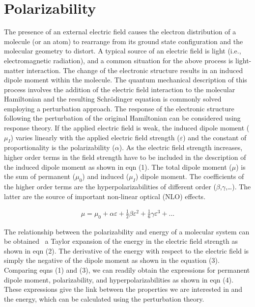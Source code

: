 \Appendix{}

\label{appendix:A}

\section{Polarizability}

The presence of an external electric field causes the electron distribution of a molecule (or an atom) to rearrange from its ground state configuration and the molecular geometry to distort. A typical source of an electric field is light (i.e., electromagnetic radiation), and a common situation for the above process is light-matter interaction. The change of the electronic structure results in an induced dipole moment within the molecule. The quantum mechanical description of this process involves the addition of the electric field interaction to the molecular Hamiltonian and the resulting Schrödinger equation is commonly solved employing a perturbation approach. The response of the electronic structure following the perturbation of the original Hamiltonian can be considered using response theory.
If the applied electric field is weak, the induced dipole moment ($\mu_I$) varies linearly with the applied electric field strength ($\varepsilon$) and the constant of proportionality is the polarizability ($\alpha$). As the electric field strength increases, higher order terms in the field strength have to be included in the description of the induced dipole moment as shown in eqn (1). The total dipole moment ($\mu$) is the sum of permanent ($\mu_0$) and induced ($\mu_I$) dipole moment. The coefficients of the higher order terms are the hyperpolarizabilities of different order ($\beta$,$\gamma$,…). The latter are the source of important non-linear optical (NLO) effects. 

\begin{align}
 \mu = \mu_0 +  \alpha  \varepsilon + \frac{1}{2}  \beta  \varepsilon ^{2} +\frac{1}{6}   \gamma   \varepsilon ^{3}+...
\end{align}
 

The relationship between the polarizability and energy of a molecular system can be obtained \via\ a Taylor expansion of the energy in the electric field strength as shown in eqn (2). The derivative of the energy with respect to the electric field is simply the negative of the dipole moment as shown in the equation (3). Comparing eqns (1) and (3), we can readily obtain the expressions for permanent dipole moment, polarizability, and hyperpolarizabilities as shown in eqn (4). These expressions give the link between the properties we are interested in and the energy, which can be calculated using the perturbation theory. 

